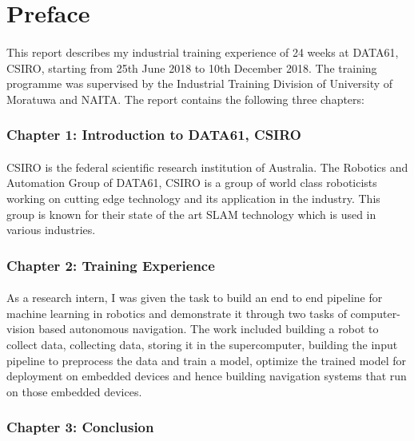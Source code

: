 \section*{Preface}

\paragraph{}
This report describes my industrial training experience of 24 weeks at DATA61, CSIRO, starting from 25th June 2018 to 10th December 2018. The training programme was supervised by the Industrial Training Division of University of Moratuwa and NAITA. The report contains the following three chapters:

\subsubsection*{Chapter 1: Introduction to DATA61, CSIRO}
\paragraph{}
CSIRO is the federal scientific research institution of Australia. The Robotics and Automation Group of DATA61, CSIRO is a group of world class roboticists working on cutting edge technology and its application in the industry. This group is known for their state of the art SLAM technology which is used in various industries. 

\subsubsection*{Chapter 2: Training Experience}
\paragraph{}
As a research intern, I was given the task to build an end to end pipeline for machine learning in robotics and demonstrate it through two tasks of computer-vision based autonomous navigation. The work included building a robot to collect data, collecting data, storing it in the supercomputer, building the input pipeline to preprocess the data and  train a model, optimize the trained model for deployment on embedded devices and hence building navigation systems that run on those embedded devices.

\subsubsection*{Chapter 3: Conclusion}
